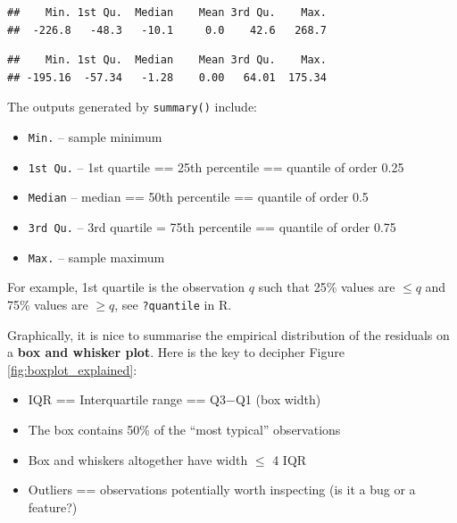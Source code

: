 \documentclass[10pt,b5paper,krantz1]{krantz}
\newenvironment{Shaded}{\begin{snugshade}}{\end{snugshade}}
\newcommand{\KeywordTok}[1]{\textcolor[rgb]{0.27,0.27,0.27}{\textbf{#1}}}
\newcommand{\NormalTok}[1]{#1}
\newcommand{\OperatorTok}[1]{\textcolor[rgb]{0.43,0.43,0.43}{\textbf{#1}}}
\providecommand{\tightlist}{%
  \setlength{\itemsep}{0pt}\setlength{\parskip}{0pt}}
\begin{document}
\begin{verbatim}
##    Min. 1st Qu.  Median    Mean 3rd Qu.    Max. 
##  -226.8   -48.3   -10.1     0.0    42.6   268.7
\end{verbatim}

\begin{Shaded}
\end{Shaded}

\begin{verbatim}
##    Min. 1st Qu.  Median    Mean 3rd Qu.    Max. 
## -195.16  -57.34   -1.28    0.00   64.01  175.34
\end{verbatim}

The outputs generated by \texttt{summary()} include:

\begin{itemize}
\tightlist
\item
  \texttt{Min.} -- sample minimum
\item
  \texttt{1st\ Qu.} -- 1st quartile == 25th percentile == quantile of order 0.25
\item
  \texttt{Median} -- median == 50th percentile == quantile of order 0.5
\item
  \texttt{3rd\ Qu.} -- 3rd quartile = 75th percentile == quantile of order 0.75
\item
  \texttt{Max.} -- sample maximum
\end{itemize}

For example, 1st quartile is the observation \(q\) such that
25\% values are \(\le q\) and 75\% values are \(\ge q\),
see \texttt{?quantile} in R.

Graphically, it is nice to summarise the empirical distribution
of the residuals on a \textbf{box and whisker plot}.
Here is the key to decipher Figure \ref{fig:boxplot_explained}:

\begin{itemize}
\tightlist
\item
  IQR == Interquartile range == Q3\(-\)Q1 (box width)
\item
  The box contains 50\% of the ``most typical'' observations
\item
  Box and whiskers altogether have width \(\le\) 4 IQR
\item
  Outliers == observations potentially worth inspecting (is it a bug or a feature?)
\end{itemize}
\end{document}
